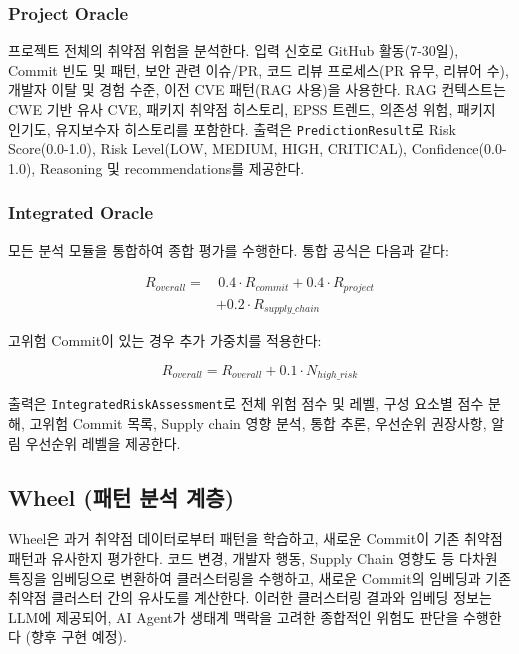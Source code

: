 ﻿\documentclass[conference]{IEEEtran}
\begin{document}
\subsubsection{Project Oracle}

프로젝트 전체의 취약점 위험을 분석한다. 입력 신호로 GitHub 활동(7-30일), Commit 빈도 및 패턴, 보안 관련 이슈/PR, 코드 리뷰 프로세스(PR 유무, 리뷰어 수), 개발자 이탈 및 경험 수준, 이전 CVE 패턴(RAG 사용)을 사용한다. RAG 컨텍스트는 CWE 기반 유사 CVE, 패키지 취약점 히스토리, EPSS 트렌드, 의존성 위험, 패키지 인기도, 유지보수자 히스토리를 포함한다. 출력은 \texttt{PredictionResult}로 Risk Score(0.0-1.0), Risk Level(LOW, MEDIUM, HIGH, CRITICAL), Confidence(0.0-1.0), Reasoning 및 recommendations를 제공한다.

\subsubsection{Integrated Oracle}

모든 분석 모듈을 통합하여 종합 평가를 수행한다. 통합 공식은 다음과 같다:

\begin{equation}
\begin{split}
R_{overall} = & \, 0.4 \cdot R_{commit} + 0.4 \cdot R_{project} \\
              & + 0.2 \cdot R_{supply\_chain}
\end{split}
\end{equation}

고위험 Commit이 있는 경우 추가 가중치를 적용한다:

\begin{equation}
R_{overall} = R_{overall} + 0.1 \cdot N_{high\_risk}
\end{equation}

출력은 \texttt{IntegratedRiskAssessment}로 전체 위험 점수 및 레벨, 구성 요소별 점수 분해, 고위험 Commit 목록, Supply chain 영향 분석, 통합 추론, 우선순위 권장사항, 알림 우선순위 레벨을 제공한다.

\subsection{Wheel (패턴 분석 계층)}

Wheel은 과거 취약점 데이터로부터 패턴을 학습하고, 새로운 Commit이 기존 취약점 패턴과 유사한지 평가한다. 코드 변경, 개발자 행동, Supply Chain 영향도 등 다차원 특징을 임베딩으로 변환하여 클러스터링을 수행하고, 새로운 Commit의 임베딩과 기존 취약점 클러스터 간의 유사도를 계산한다. 이러한 클러스터링 결과와 임베딩 정보는 LLM에 제공되어, AI Agent가 생태계 맥락을 고려한 종합적인 위험도 판단을 수행한다 (향후 구현 예정).
\end{document}
